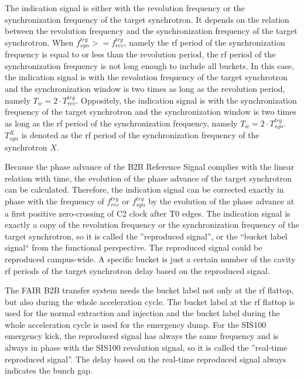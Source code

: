The indication signal is either with the revolution frequency or the synchronization frequency of the target synchrotron. It depends on the relation between the revolution frequency and the synchronization frequency of the target synchrotron.  When $f_{\mathit{syn}}^{trg}>=f_{\mathit{rev}}^{trg}$, namely the rf period of the synchronization frequency is equal to or less than the revolution period, the  rf period of the synchronization frequency is not long enough to include all buckets. In this case, the indication signal is with the revolution frequency of the target synchrotron and the synchronization window is two times as long as the revolution period, namely $T_{w}=2\cdot T_{\mathit{rev}}^{\mathit{trg}}$. Oppositely, the indication signal is with the synchronization frequency of the target synchrotron and the synchronization window is two times as long as the rf period of the synchronization frequency, namely $T_{w}=2\cdot T_\mathit{syn}^{\mathit{trg}}$. $T_\mathit{syn}^X$ is denoted as the rf period of the synchronization frequency of the synchrotron $X$. 

Because the phase advance of the B2B Reference Signal complies with the linear relation with time, the evolution of the phase advance of the target synchrotron can be calculated. Therefore, the indication signal can be corrected exactly in phase with the frequency of $f_{\mathit{rev}}^{trg}$ or $f_{\mathit{syn}}^{trg}$ by the evolution of the phase advance at a first positive zero-crossing of C2 clock after T0 edges. The indication signal is exactly a copy of the revolution frequency or the synchronization frequency of the target synchrotron, so it is called the ''reproduced signal'', or the ``bucket label signal`` from the functional perspective. The reproduced signal could be reproduced campus-wide. A specific bucket is just a certain number of the cavity rf periods of the target synchrotron delay based on the reproduced signal.






The FAIR B2B transfer system needs the bucket label not only at the rf flattop, but also during the whole acceleration cycle. The bucket label at the rf flattop is used for the normal extraction and injection and the bucket label during the whole acceleration cycle is used for the emergency dump. For the SIS100 emergency kick, the reproduced signal has always the same frequency and is always in phase with the SIS100 revolution signal, so it is called the ''real-time reproduced signal''. The delay based on the real-time reproduced signal always indicates the bunch gap.


